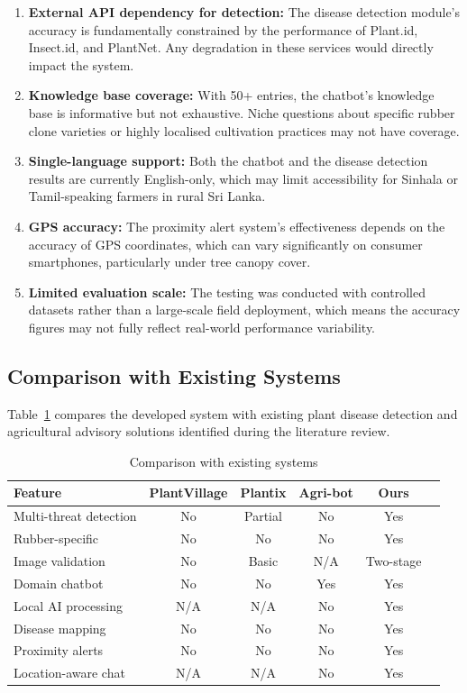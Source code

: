 \begin{enumerate}
    \item \textbf{External API dependency for detection:} The disease detection module's accuracy is fundamentally constrained by the performance of Plant.id, Insect.id, and PlantNet. Any degradation in these services would directly impact the system.

    \item \textbf{Knowledge base coverage:} With 50+ entries, the chatbot's knowledge base is informative but not exhaustive. Niche questions about specific rubber clone varieties or highly localised cultivation practices may not have coverage.

    \item \textbf{Single-language support:} Both the chatbot and the disease detection results are currently English-only, which may limit accessibility for Sinhala or Tamil-speaking farmers in rural Sri Lanka.

    \item \textbf{GPS accuracy:} The proximity alert system's effectiveness depends on the accuracy of GPS coordinates, which can vary significantly on consumer smartphones, particularly under tree canopy cover.

    \item \textbf{Limited evaluation scale:} The testing was conducted with controlled datasets rather than a large-scale field deployment, which means the accuracy figures may not fully reflect real-world performance variability.
\end{enumerate}

\subsection{Comparison with Existing Systems}

Table~\ref{tab:comparison} compares the developed system with existing plant disease detection and agricultural advisory solutions identified during the literature review.

\begin{table}[H]
\centering
\caption{Comparison with existing systems}
\label{tab:comparison}
\begin{tabularx}{\textwidth}{|l|c|c|c|c|c|}
\hline
\textbf{Feature} & \textbf{PlantVillage} & \textbf{Plantix} & \textbf{Agri-bot} & \textbf{Ours} \\
\hline
Multi-threat detection & No & Partial & No & Yes \\
\hline
Rubber-specific & No & No & No & Yes \\
\hline
Image validation & No & Basic & N/A & Two-stage \\
\hline
Domain chatbot & No & No & Yes & Yes \\
\hline
Local AI processing & N/A & N/A & No & Yes \\
\hline
Disease mapping & No & No & No & Yes \\
\hline
Proximity alerts & No & No & No & Yes \\
\hline
Location-aware chat & N/A & N/A & No & Yes \\
\hline
\end{tabularx}
\end{table}

\newpage
